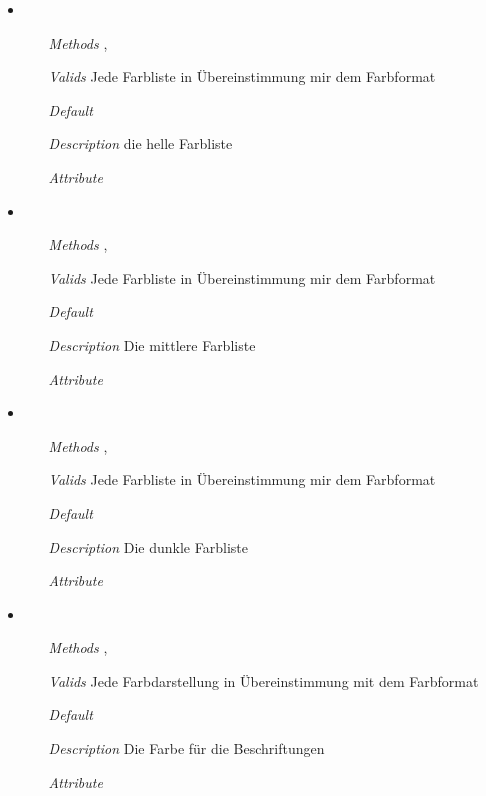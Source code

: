 \begin{itemize}
\item {}
\begin{enumerate}
\item[\textit{Methods}] ,
\item[\textit{Valids}] Jede Farbliste in \"Ubereinstimmung mir dem
  Farbformat
\item[\textit{Default}] \wancicode{[]}
\item[\textit{Description}] die helle Farbliste
\item[\textit{Attribute}] 
\end{enumerate}

\item {}
\begin{enumerate}
\item[\textit{Methods}] ,
\item[\textit{Valids}] Jede Farbliste in \"Ubereinstimmung mir dem
  Farbformat
\item[\textit{Default}] \wancicode{[]}
\item[\textit{Description}] Die mittlere Farbliste
\item[\textit{Attribute}] 
\end{enumerate}

\item {}
\begin{enumerate}
\item[\textit{Methods}] ,
\item[\textit{Valids}] Jede Farbliste in \"Ubereinstimmung mir dem
  Farbformat
\item[\textit{Default}] \wancicode{[]}
\item[\textit{Description}] Die dunkle Farbliste
\item[\textit{Attribute}] 
\end{enumerate}

\item {}
\begin{enumerate}
\item[\textit{Methods}] , 
\item[\textit{Valids}] Jede Farbdarstellung in \"Ubereinstimmung mit
  dem Farbformat
\item[\textit{Default}] 
\item[\textit{Description}] Die Farbe f\"ur die Beschriftungen
\item[\textit{Attribute}] 
\end{enumerate}


\end{itemize}
